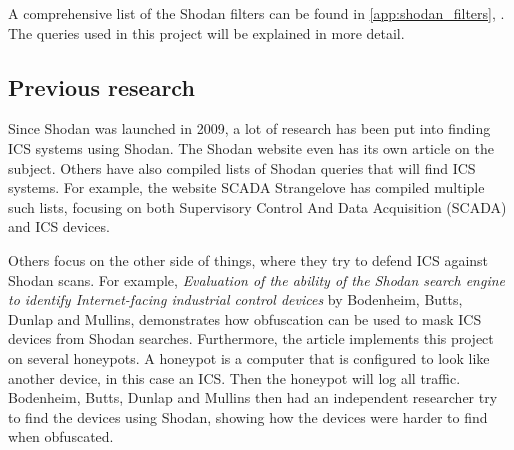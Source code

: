A comprehensive list of the Shodan filters can be found in \cref{app:shodan_filters}, . The queries used in this project will be explained in more detail. 

\subsection{Previous research}
Since Shodan was launched in 2009, a lot of research has been put into finding ICS systems using Shodan. The Shodan website even has its own article on the subject.\cite{shodan_ics}  Others have also compiled lists of Shodan queries that will find ICS systems. For example, the website SCADA Strangelove has compiled multiple such lists, focusing on both Supervisory Control And Data Acquisition (SCADA) and ICS devices.\cite{scadasl_cheatsheet} \cite{scadasl_shodan}

Others focus on the other side of things, where they try to defend ICS against Shodan scans. For example, \textit{Evaluation of the ability of the Shodan search engine to identify Internet-facing industrial control devices} by Bodenheim, Butts, Dunlap and Mullins, \cite{bodenheim_butts_dunlap_mullins_2014} demonstrates how obfuscation can be used to mask ICS devices from Shodan searches. Furthermore, the article implements this project on several honeypots. A honeypot is a computer that is configured to look like another device, in this case an ICS. Then the honeypot will log all traffic. Bodenheim, Butts, Dunlap and Mullins then had an independent researcher try to find the devices using Shodan, showing how the devices were harder to find when obfuscated.

\newpage

